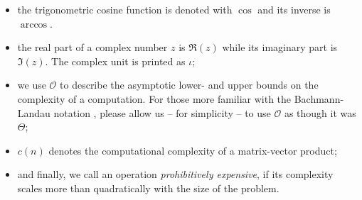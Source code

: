 \begin{itemize}
    \item the trigonometric cosine function is denoted with $\cos$ and its inverse is $\arccos$.
    \item the real part of a complex number $z$ is $\Re(z)$ while its imaginary part is $\Im(z)$.
          The complex unit is printed as $\iota$;
    \item we use $\mathcal{O}$ to describe the asymptotic lower- and upper bounds
          on the complexity of a computation. For those more familiar with the
          Bachmann-Landau notation \cite[section~3.2]{cormen2009algorithms},
          please allow us -- for simplicity -- to use $\mathcal{O}$ as though it was $\Theta$;
    \item $c(n)$ denotes the computational complexity of a matrix-vector product;
    \item and finally, we call an operation \emph{prohibitively expensive}, if its
          complexity scales more than quadratically with the size of the problem.
\end{itemize}

